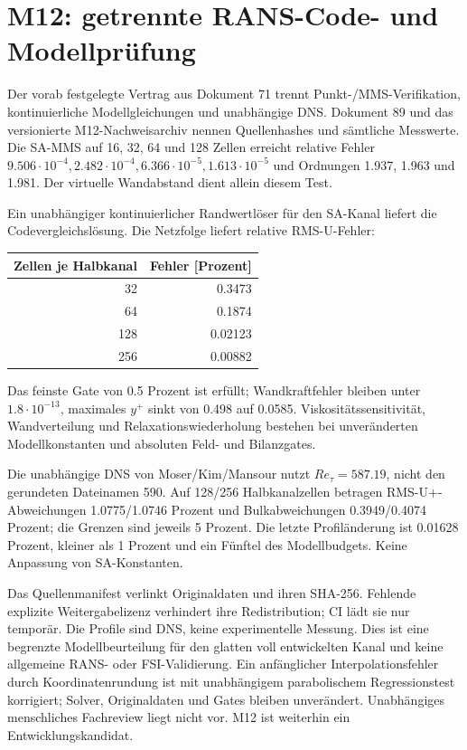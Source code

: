 \chapter{M12: getrennte RANS-Code- und Modellprüfung}\label{vv:rans}
Der vorab festgelegte Vertrag aus Dokument 71 trennt Punkt-/MMS-Verifikation,
kontinuierliche Modellgleichungen und unabhängige DNS. Dokument 89 und das
versionierte M12-Nachweisarchiv nennen Quellenhashes und sämtliche Messwerte.
Die SA-MMS auf 16, 32, 64 und 128 Zellen erreicht relative Fehler
\(9.506\cdot10^{-4},2.482\cdot10^{-4},6.366\cdot10^{-5},1.613\cdot10^{-5}\)
und Ordnungen 1.937, 1.963 und 1.981. Der virtuelle Wandabstand dient allein diesem Test.

Ein unabhängiger kontinuierlicher Randwertlöser für den SA-Kanal liefert
die Codevergleichslösung. Die Netzfolge liefert relative RMS-U-Fehler:
\begin{center}
\begin{tabular}{rr}
\toprule
Zellen je Halbkanal & Fehler [Prozent] \\
\midrule
32 & 0.3473 \\
64 & 0.1874 \\
128 & 0.02123 \\
256 & 0.00882 \\
\bottomrule
\end{tabular}
\end{center}
Das feinste Gate von 0.5 Prozent ist erfüllt; Wandkraftfehler bleiben unter
\(1.8\cdot10^{-13}\), maximales \(y^+\) sinkt von 0.498 auf 0.0585.
Viskositätssensitivität, Wandverteilung und Relaxationswiederholung bestehen
bei unveränderten Modellkonstanten und absoluten Feld- und Bilanzgates.

Die unabhängige DNS von Moser/Kim/Mansour nutzt \(Re_\tau=587.19\),
nicht den gerundeten Dateinamen 590. Auf 128/256 Halbkanalzellen betragen
RMS-U+-Abweichungen 1.0775/1.0746 Prozent und Bulkabweichungen
0.3949/0.4074 Prozent; die Grenzen sind jeweils 5 Prozent.
Die letzte Profiländerung ist 0.01628 Prozent, kleiner als 1 Prozent und
ein Fünftel des Modellbudgets. Keine Anpassung von SA-Konstanten.

Das Quellenmanifest verlinkt Originaldaten und ihren SHA-256. Fehlende explizite
Weitergabelizenz verhindert ihre Redistribution; CI lädt sie nur temporär.
Die Profile sind DNS, keine experimentelle Messung. Dies ist eine begrenzte
Modellbeurteilung für den glatten voll entwickelten Kanal und keine allgemeine
RANS- oder FSI-Validierung. Ein anfänglicher Interpolationsfehler durch
Koordinatenrundung ist mit unabhängigem parabolischem Regressionstest korrigiert;
Solver, Originaldaten und Gates bleiben unverändert. Unabhängiges menschliches
Fachreview liegt nicht vor. M12 ist weiterhin ein Entwicklungskandidat.
